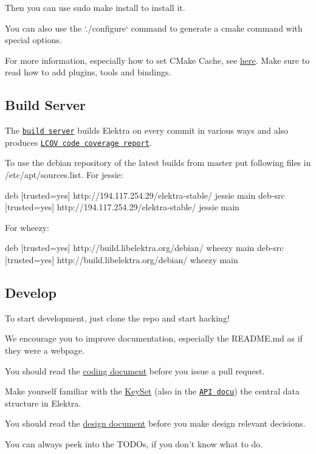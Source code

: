 Then you can use {\ttfamily sudo make install} to install it.

You can also use the `./configure` command to generate a {\ttfamily cmake} command with special options.

For more information, especially how to set C\+Make Cache, see \hyperlink{doc_COMPILE_md}{here}. Make sure to read how to add plugins, tools and bindings.

\subsection*{Build Server}

The \href{http://build.libelektra.org:8080/}{\tt build server} builds Elektra on every commit in various ways and also produces \href{http://doc.libelektra.org/coverage/latest}{\tt L\+C\+O\+V code coverage report}.

To use the debian repository of the latest builds from master put following files in /etc/apt/sources.list. For jessie\+: \begin{DoxyVerb}    deb     [trusted=yes] http://194.117.254.29/elektra-stable/ jessie main
    deb-src [trusted=yes] http://194.117.254.29/elektra-stable/ jessie main
\end{DoxyVerb}


For wheezy\+: \begin{DoxyVerb}     deb     [trusted=yes] http://build.libelektra.org/debian/ wheezy main
     deb-src [trusted=yes] http://build.libelektra.org/debian/ wheezy main
\end{DoxyVerb}


\subsection*{Develop}

To start development, just clone the repo and start hacking!


\begin{DoxyItemize}
\item We encourage you to improve documentation, especially the R\+E\+A\+D\+M\+E.\+md as if they were a webpage.
\item You should read the \hyperlink{doc_CODING_md}{coding document} before you issue a pull request.
\item Make yourself familiar with the \hyperlink{md_doc_help_elektra-data-structures_doc_help_elektra-data-structures_md}{Key\+Set} (also in the \href{http://doc.libelektra.org/api/latest/html/group__keyset.html}{\tt A\+P\+I docu}) the central data structure in Elektra.
\item You should read the \hyperlink{doc_DESIGN_md}{design document} before you make design relevant decisions.
\item You can always peek into the T\+O\+D\+Os, if you don't know what to do. 
\end{DoxyItemize}